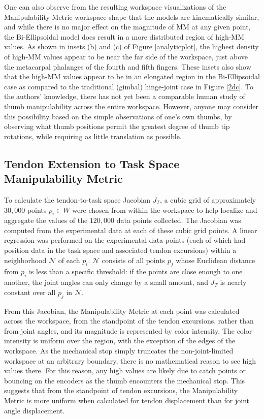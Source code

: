 \documentclass[journal]{IEEEtran}
\begin{document}
One can also observe from the resulting workspace visualizations of the Manipulability Metric workspace shape that the models are kinematically similar, and while there is no major effect on the magnitude of MM at any given point, the Bi-Ellipsoidal model does result in a more distributed region of high-MM values. As shown in insets (b) and (c) of Figure \ref{analyticplot}, the highest density of high-MM values appear to be near the far side of the workspace, just above the metacarpal phalanges of the fourth and fifth fingers. These insets also show that the high-MM values appear to be in an elongated region in the Bi-Ellipsoidal case as compared to the traditional (gimbal) hinge-joint case in Figure \ref{2dc}. To the authors' knowledge, there has not yet been a comparable human study of thumb manipulability across the entire workspace. However, anyone may consider this possibility based on the simple observations of one's own thumbs, by observing what thumb positions permit the greatest degree of thumb tip rotations, while requiring as little translation as possible. 


\subsection{Tendon Extension to Task Space Manipulability Metric}

To calculate the tendon-to-task space Jacobian $J_T$, a cubic grid of approximately $30,000$ points $p_i \in W$ were chosen from within the workspace to help localize and aggregate the values of the $120,000$ data points collected. The Jacobian was computed from the experimental data at each of these cubic grid points. A linear regression was performed on the experimental data points (each of which had position data in the task space and associated tendon excursions) within a neighborhood $\mathcal{N}$ of each $p_i$. $\mathcal{N}$ consists of all points $p_j$ whose Euclidean distance from $p_i$ is less than a specific threshold: if the points are close enough to one another, the joint angles can only change by a small amount, and $J_T$ is nearly constant over all $p_j$ in $\mathcal{N}$.

From this Jacobian, the Manipulability Metric at each point was calculated across the workspace, from the standpoint of the tendon excursions, rather than from joint angles, and its magnitude is represented by color intensity. The color intensity is uniform over the region, with the exception of the edges of the workspace. As the mechanical stop simply truncates the non-joint-limited workspace at an arbitrary boundary, there is no mathematical reason to see high values there. For this reason, any high values are likely due to catch points or bouncing on the encoders as the thumb encounters the mechanical stop. This suggests that from the standpoint of tendon excursions, the Manipulability Metric is more uniform when calculated for tendon displacement than for joint angle displacement.
\end{document}
